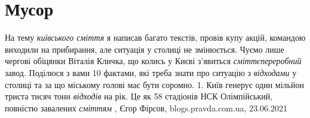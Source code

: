  
 
 
 
 
\chapter{Мусор}
\label{sec:slova.musor}

На тему \emph{київського сміття} я написав багато текстів, провів купу акцій,
командою виходили на прибирання, але ситуація у столиці не змінюється. Чуємо
лише чергові обіцянки Віталія Кличка, що колись у Києві з'явиться
\emph{сміттєпереробний} завод. Поділюся з вами 10 фактами, які треба знати про
ситуацію з \emph{відходами} у столиці та за що міському голові має бути
соромно. 1. Київ генерує один мільйон триста тисяч тонн \emph{відходів} на рік.
Це як 58 стадіонів НСК Олімпійський, повністю завалених \emph{сміттям}
, 
Єгор Фірсов, blogs.pravda.com.ua, 23.06.2021


